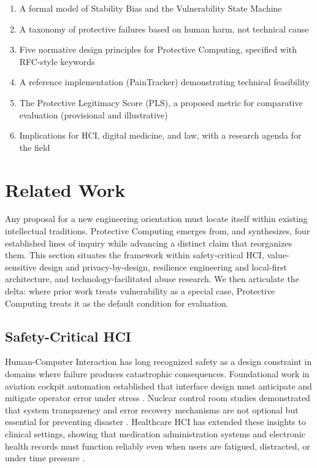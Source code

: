 \documentclass[acmsmall,review]{acmart}
\begin{document}
\begin{enumerate}
    \item A formal model of Stability Bias and the Vulnerability State Machine
    \item A taxonomy of protective failures based on human harm, not technical cause
    \item Five normative design principles for Protective Computing, specified with RFC-style keywords
    \item A reference implementation (PainTracker) demonstrating technical feasibility
    \item The Protective Legitimacy Score (PLS), a proposed metric for comparative evaluation (provisional and illustrative)
    \item Implications for HCI, digital medicine, and law, with a research agenda for the field
\end{enumerate}

\section{Related Work}

Any proposal for a new engineering orientation must locate itself within existing intellectual traditions. Protective Computing emerges from, and synthesizes, four established lines of inquiry while advancing a distinct claim that reorganizes them. This section situates the framework within safety-critical HCI, value-sensitive design and privacy-by-design, resilience engineering and local-first architecture, and technology-facilitated abuse research. We then articulate the delta: where prior work treats vulnerability as a special case, Protective Computing treats it as the default condition for evaluation.

\subsection{Safety-Critical HCI}

Human-Computer Interaction has long recognized safety as a design constraint in domains where failure produces catastrophic consequences. Foundational work in aviation cockpit automation established that interface design must anticipate and mitigate operator error under stress \cite{Wiener1988,Reason1990}. Nuclear control room studies demonstrated that system transparency and error recovery mechanisms are not optional but essential for preventing disaster \cite{Woods2006}. Healthcare HCI has extended these insights to clinical settings, showing that medication administration systems and electronic health records must function reliably even when users are fatigued, distracted, or under time pressure \cite{Kushniruk2001,Patel2017}.
\end{document}
